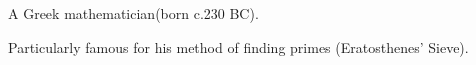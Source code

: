 A Greek mathematician(born c.230 BC).
\par
Particularly famous for his method of finding primes (Eratosthenes' Sieve).